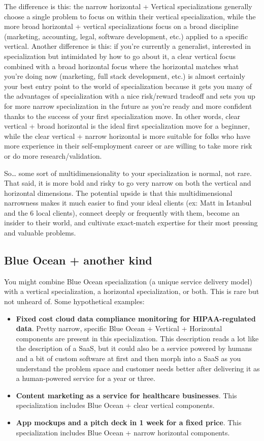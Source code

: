 The difference is this: the narrow horizontal + Vertical specializations generally choose a single problem to focus on within their vertical specialization, while the more broad horizontal + vertical specializations focus on a broad discipline (marketing, accounting, legal, software development, etc.) applied to a specific vertical. Another difference is this: if you're currently a generalist, interested in specialization but intimidated by how to go about it, a clear vertical focus combined with a broad horizontal focus where the horizontal matches what you're doing now (marketing, full stack development, etc.) is almost certainly your best entry point to the world of specialization because it gets you many of the advantages of specialization with a nice risk/reward tradeoff and sets you up for more narrow specialization in the future as you're ready and more confident thanks to the success of your first specialization move. In other words, clear vertical + broad horizontal is the ideal first specialization move for a beginner, while the clear vertical + narrow horizontal is more suitable for folks who have more experience in their self-employment career or are willing to take more risk or do more research/validation.

So\ldots{} some sort of multidimensionality to your specialization is normal, not rare. That said, it is more bold and risky to go very narrow on both the vertical and horizontal dimensions. The potential upside is that this multidimensional narrowness makes it much easier to find your ideal clients (ex: Matt in Istanbul and the 6 local clients), connect deeply or frequently with them, become an insider to their world, and cultivate exact-match expertise for their most pressing and valuable problems.

\subsection{Blue Ocean + another kind}

You might combine Blue Ocean specialization (a unique service delivery model) with a vertical specialization, a horizontal specialization, or both. This is rare but not unheard of. Some hypothetical examples:

\begin{itemize}
\item \textbf{Fixed cost cloud data compliance monitoring for HIPAA-regulated data}. Pretty narrow, specific Blue Ocean + Vertical + Horizontal components are present in this specialization. This description reads a lot like the description of a SaaS, but it could also be a service powered by humans and a bit of custom software at first and then morph into a SaaS as you understand the problem space and customer needs better after delivering it as a human-powered service for a year or three.
\item \textbf{Content marketing as a service for healthcare businesses}. This specialization includes Blue Ocean + clear vertical components.
\item \textbf{App mockups and a pitch deck in 1 week for a fixed price}. This specialization includes Blue Ocean + narrow horizontal components.
\end{itemize}

